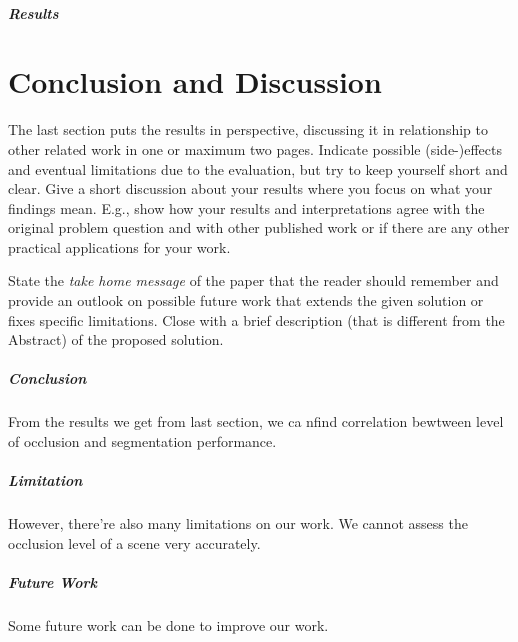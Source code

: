 \documentclass[11pt, a4paper,oneside,chapterprefix=false]{scrbook}
\begin{document}
\paragraph{Results}


\chapter{Conclusion and Discussion} \label{chp:conclusion}

The last section puts the results in perspective, discussing it in relationship to other related work in one or maximum two pages. Indicate possible (side-)effects and eventual limitations due to the evaluation, but try to keep yourself short and clear. Give a short discussion about your results where you focus on what your findings mean. E.g., show how your results and interpretations agree with the original problem question and with other published work or if there are any other practical applications for your work.

State the \emph{take home message} of the paper that the reader should remember and provide an outlook on possible future work that extends the given solution or fixes specific limitations. Close with a brief description (that is different from the Abstract) of the proposed solution.

\paragraph{Conclusion}

From the results we get from last section, we ca nfind correlation bewtween level of occlusion and segmentation performance.

\paragraph{Limitation}

However, there're also many limitations on our work. We cannot assess the occlusion level of a scene very accurately.

\paragraph{Future Work}

Some future work can be done to improve our work.
\end{document}
